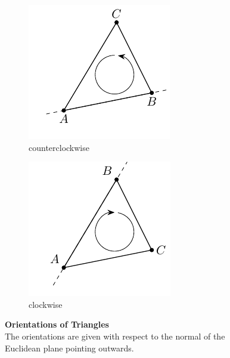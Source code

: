\documentclass{stdlocal}
\begin{document}
  \begin{figure}[h]
    \centering
    \begin{subfigure}[b]{0.49\linewidth}
      \centering
      \includegraphics[width=0.7\linewidth]{figures/triangle-counterclockwise.pdf}
      \caption{counterclockwise}
    \end{subfigure}
    \begin{subfigure}[b]{0.49\linewidth}
      \centering
      \includegraphics[width=0.7\linewidth]{figures/triangle-clockwise.pdf}
      \caption{clockwise}
    \end{subfigure}
    \caption[Orientations of Triangles]{%
      \textbf{Orientations of Triangles}\\
      The orientations are given with respect to the normal of the Euclidean plane pointing outwards.
    }
    \label{fig:triangle-orientations}
  \end{figure}
\end{document}
